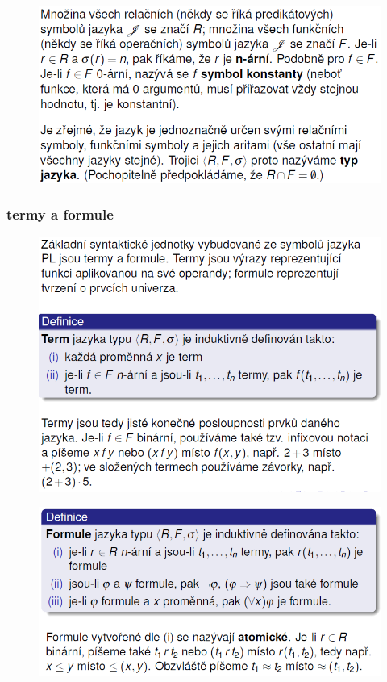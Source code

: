 \documentclass[10pt,a4paper]{article}
\theoremstyle{note}
\begin{document}
			\begin{figure}[H]
			\centering
			\includegraphics[width=13cm]{img/JazykPL2.png}
			\end{figure}

		\subsubsection{termy a formule}

			\begin{figure}[H]
			\centering
			\includegraphics[width=13cm]{img/termy.png}
			\end{figure}

			\begin{figure}[H]
			\centering
			\includegraphics[width=13cm]{img/formulePL.png}
			\end{figure}
\end{document}
